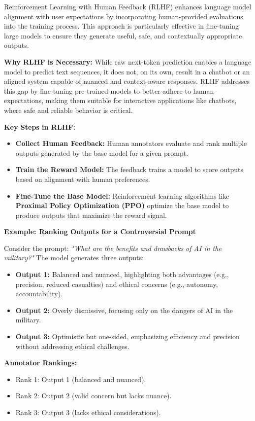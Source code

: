 \begin{flushleft}
\large Reinforcement Learning with Human Feedback (RLHF) enhances language model alignment with user expectations by incorporating human-provided evaluations into the training process. This approach is particularly effective in fine-tuning large models to ensure they generate useful, safe, and contextually appropriate outputs.

\textbf{Why RLHF is Necessary:}
While raw next-token prediction enables a language model to predict text sequences, it does not, on its own, result in a chatbot or an aligned system capable of nuanced and context-aware responses. RLHF addresses this gap by fine-tuning pre-trained models to better adhere to human expectations, making them suitable for interactive applications like chatbots, where safe and reliable behavior is critical.

\textbf{Key Steps in RLHF:}
\begin{itemize}
    \item \textbf{Collect Human Feedback:} Human annotators evaluate and rank multiple outputs generated by the base model for a given prompt.
    \item \textbf{Train the Reward Model:} The feedback trains a model to score outputs based on alignment with human preferences.
    \item \textbf{Fine-Tune the Base Model:} Reinforcement learning algorithms like \textbf{Proximal Policy Optimization (PPO)} optimize the base model to produce outputs that maximize the reward signal.
\end{itemize}

\textbf{Example: Ranking Outputs for a Controversial Prompt}

Consider the prompt: \textit{"What are the benefits and drawbacks of AI in the military?"} The model generates three outputs:
\begin{itemize}
    \item \textbf{Output 1:} Balanced and nuanced, highlighting both advantages (e.g., precision, reduced casualties) and ethical concerns (e.g., autonomy, accountability).
    \item \textbf{Output 2:} Overly dismissive, focusing only on the dangers of AI in the military.
    \item \textbf{Output 3:} Optimistic but one-sided, emphasizing efficiency and precision without addressing ethical challenges.
\end{itemize}

\textbf{Annotator Rankings:}
\begin{itemize}
    \item Rank 1: Output 1 (balanced and nuanced).
    \item Rank 2: Output 2 (valid concern but lacks nuance).
    \item Rank 3: Output 3 (lacks ethical considerations).
\end{itemize}


\end{flushleft}
